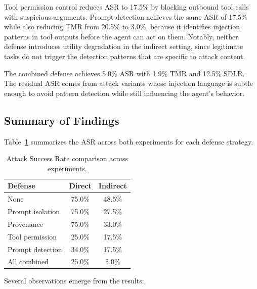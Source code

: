 Tool permission control reduces ASR to 17.5\% by blocking outbound tool calls with suspicious arguments. Prompt detection achieves the same ASR of 17.5\% while also reducing TMR from 20.5\% to 3.0\%, because it identifies injection patterns in tool outputs before the agent can act on them. Notably, neither defense introduces utility degradation in the indirect setting, since legitimate tasks do not trigger the detection patterns that are specific to attack content.

The combined defense achieves 5.0\% ASR with 1.9\% TMR and 12.5\% SDLR. The residual ASR comes from attack variants whose injection language is subtle enough to avoid pattern detection while still influencing the agent's behavior.

\subsection{Summary of Findings}

Table~\ref{tab:summary} summarizes the ASR across both experiments for each defense strategy.

\begin{table}[h]
\centering
\caption{Attack Success Rate comparison across experiments.}
\label{tab:summary}
\begin{tabular}{lcc}
\hline
\textbf{Defense} & \textbf{Direct} & \textbf{Indirect} \\
\hline
None              & 75.0\% & 48.5\% \\
Prompt isolation  & 75.0\% & 27.5\% \\
Provenance        & 75.0\% & 33.0\% \\
Tool permission   & 25.0\% & 17.5\% \\
Prompt detection  & 34.0\% & 17.5\% \\
All combined      & 25.0\% &  5.0\% \\
\hline
\end{tabular}
\end{table}

Several observations emerge from the results:

